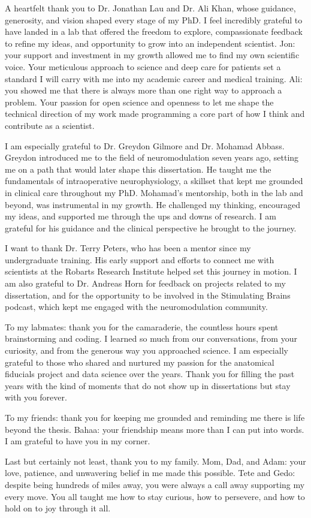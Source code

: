 \onehalfspacing
A heartfelt thank you to Dr. Jonathan Lau and Dr. Ali Khan, whose guidance, generosity, and vision shaped every stage of my PhD. I feel incredibly grateful to have landed in a lab that offered the freedom to explore, compassionate feedback to refine my ideas, and opportunity to grow into an independent scientist. Jon: your support and investment in my growth allowed me to find my own scientific voice. Your meticulous approach to science and deep care for patients set a standard I will carry with me into my academic career and medical training. Ali: you showed me that there is always more than one right way to approach a problem. Your passion for open science and openness to let me shape the technical direction of my work made programming a core part of how I think and contribute as a scientist.

I am especially grateful to Dr. Greydon Gilmore and Dr. Mohamad Abbass. Greydon introduced me to the field of neuromodulation seven years ago, setting me on a path that would later shape this dissertation. He taught me the fundamentals of intraoperative neurophysiology, a skillset that kept me grounded in clinical care throughout my PhD. Mohamad's mentorship, both in the lab and beyond, was instrumental in my growth. He challenged my thinking, encouraged my ideas, and supported me through the ups and downs of research. I am grateful for his guidance and the clinical perspective he brought to the journey.

I want to thank Dr. Terry Peters, who has been a mentor since my undergraduate training. His early support and efforts to connect me with scientists at the Robarts Research Institute helped set this journey in motion. I am also grateful to Dr. Andreas Horn for feedback on projects related to my dissertation, and for the opportunity to be involved in the Stimulating Brains podcast, which kept me engaged with the neuromodulation community.

To my labmates: thank you for the camaraderie, the countless hours spent brainstorming and coding. I learned so much from our conversations, from your curiosity, and from the generous way you approached science. I am especially grateful to those who shared and nurtured my passion for the anatomical fiducials project and data science over the years. Thank you for filling the past years with the kind of moments that do not show up in dissertations but stay with you forever.

To my friends: thank you for keeping me grounded and reminding me there is life beyond the thesis. Bahaa: your friendship means more than I can put into words. I am grateful to have you in my corner.

Last but certainly not least, thank you to my family. Mom, Dad, and Adam: your love, patience, and unwavering belief in me made this possible. Tete and Gedo: despite being hundreds of miles away, you were always a call away supporting my every move. You all taught me how to stay curious, how to persevere, and how to hold on to joy through it all.